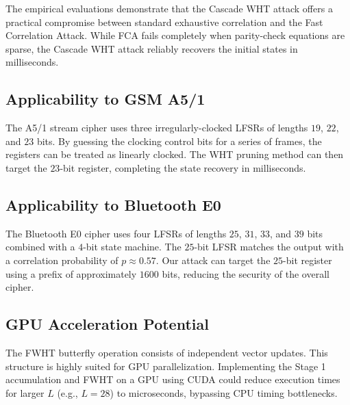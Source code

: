 The empirical evaluations demonstrate that the Cascade WHT attack offers a practical compromise between standard exhaustive correlation and the Fast Correlation Attack. While FCA fails completely when parity-check equations are sparse, the Cascade WHT attack reliably recovers the initial states in milliseconds.

\subsection{Applicability to GSM A5/1}
The A5/1 stream cipher uses three irregularly-clocked LFSRs of lengths $19$, $22$, and $23$ bits. By guessing the clocking control bits for a series of frames, the registers can be treated as linearly clocked. The WHT pruning method can then target the $23$-bit register, completing the state recovery in milliseconds.

\subsection{Applicability to Bluetooth E0}
The Bluetooth E0 cipher uses four LFSRs of lengths $25$, $31$, $33$, and $39$ bits combined with a $4$-bit state machine. The $25$-bit LFSR matches the output with a correlation probability of $p \approx 0.57$. Our attack can target the $25$-bit register using a prefix of approximately $1600$ bits, reducing the security of the overall cipher.

\subsection{GPU Acceleration Potential}
The FWHT butterfly operation consists of independent vector updates. This structure is highly suited for GPU parallelization. Implementing the Stage 1 accumulation and FWHT on a GPU using CUDA could reduce execution times for larger $L$ (e.g., $L=28$) to microseconds, bypassing CPU timing bottlenecks.
